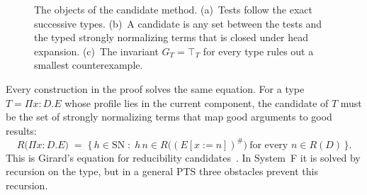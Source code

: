 \documentclass[10pt]{article}
\begin{document}
\begin{figure}[H]
\caption{The objects of the candidate method. (a)~Tests follow the exact successive
types. (b)~A candidate is any set between the tests and the typed strongly
normalizing terms that is closed under head expansion. (c)~The invariant
$G_T=\top_T$ for every type rules out a smallest counterexample.}
\label{fig:tests}
\end{figure}

Every construction in the proof solves the same equation. For a type
$T=\Pi x{:}D.E$ whose profile lies in the current component, the candidate of
$T$ must be the set of strongly normalizing terms that map good arguments to good
results:
\[
  R\bigl(\Pi x{:}D.E\bigr)\;=\;\bigl\{\,h\in\mathrm{SN}\;:\;
     h\,n\in R\bigl((E[x:=n])^\#\bigr)\ \text{for every } n\in R(D)\,\bigr\}.
\]
This is Girard's equation for reducibility candidates~\cite{Girard1989}. In
System~F it is solved by recursion on the type, but in a general PTS three obstacles
prevent this recursion.
\end{document}
